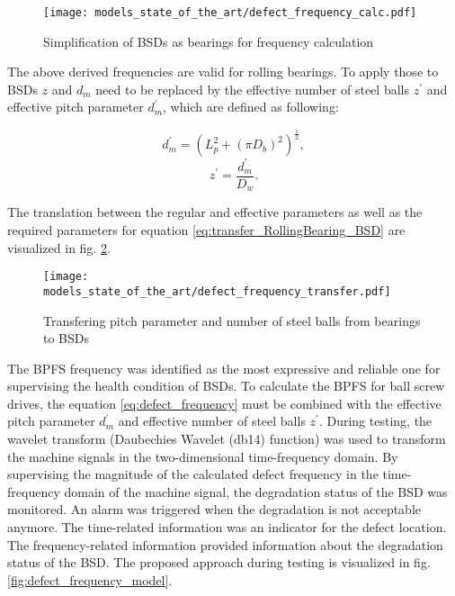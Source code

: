 \begin{figure}[H]
  \centering
  \texttt{[image: models\_state\_of\_the\_art/defect\_frequency\_calc.pdf]}
  \caption{Simplification of BSDs as bearings for frequency calculation \cite{Lee2015}}
  \label{fig:defect_frequency_calc}
\end{figure}

The above derived frequencies are valid for rolling bearings. To apply those to BSDs $z$ and $d_{m}$ need to be replaced by the effective number of steel balls $z^{'}$ and effective pitch parameter $d_{m}^{'}$, which are defined as following:

\begin{equation} \label{eq:transfer_RollingBearing_BSD}
    d_{m}^{'} = (L_{p}^{2}+(\pi D_{b})^{2})^{\frac{1}{2}},
\end{equation}
\begin{equation}
    z^{'} = \frac{d_{m}^{'}}{D_{w}}.
\end{equation}

The translation between the regular and effective parameters as well as the required parameters for equation \ref{eq:transfer_RollingBearing_BSD} are visualized in fig. \ref{fig:defect_frequency_transfer}. 

\begin{figure}[H]
  \centering
  \texttt{[image: models\_state\_of\_the\_art/defect\_frequency\_transfer.pdf]}
  \caption{Transfering pitch parameter and number of steel balls from bearings to BSDs \cite{Lee2015}}
  \label{fig:defect_frequency_transfer}
\end{figure}

The BPFS frequency was identified as the most expressive and reliable one for supervising the health condition of BSDs. To calculate the BPFS for ball screw drives, the equation \ref{eq:defect_frequency} must be combined with the effective pitch parameter $d_{m}^{'}$ and effective number of steel balls $z^{'}$. During testing, the wavelet transform (Daubechies Wavelet (db14) function) was used to transform the machine signals in the two-dimensional time-frequency domain. By supervising the magnitude of the calculated defect frequency in the time-frequency domain of the machine signal, the degradation status of the BSD was monitored. An alarm was triggered when the degradation is not acceptable anymore. The time-related information was an indicator for the defect location. The frequency-related information provided information about the degradation status of the BSD. The proposed approach during testing is visualized in fig. \ref{fig:defect_frequency_model}. 


